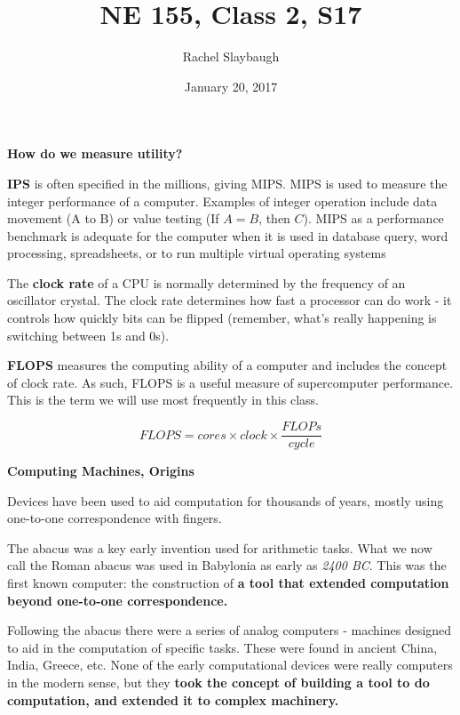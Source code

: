 \documentclass[12pt]{article}
\title{NE 155, Class 2, S17}
\author{Rachel Slaybaugh}
\date{January 20, 2017}
\begin{document}
\maketitle

\noindent \textbf{How do we measure utility?}

\textbf{IPS} is often specified in the millions, giving MIPS. MIPS is used to measure the integer performance of a computer. Examples of integer operation include data movement (A to B) or value testing (If $A = B$, then $C$). MIPS as a performance benchmark is adequate for the computer when it is used in database query, word processing, spreadsheets, or to run multiple virtual operating systems %

The \textbf{clock rate} of a CPU is normally determined by the frequency of an oscillator crystal. The clock rate determines how fast a processor can do work - it controls how quickly bits can be flipped (remember, what's really happening is switching between 1s and 0s).

\textbf{FLOPS} measures the computing ability of a computer and includes the concept of clock rate. As such, FLOPS is a useful measure of supercomputer performance. This is the term we will use most frequently in this class. 

\begin{equation}
FLOPS = cores \times clock \times \frac{FLOPs}{cycle} \nonumber
\end{equation}

\vspace*{2em}
\noindent \textbf{Computing Machines, Origins}

Devices have been used to aid computation for thousands of years, mostly using one-to-one correspondence with fingers. 

The abacus was a key early invention used for arithmetic tasks. What we now call the Roman abacus was used in Babylonia as early as \textit{2400 BC}. This was the first known computer: the construction of \textbf{a tool that extended computation beyond one-to-one correspondence.} 

Following the abacus there were a series of analog computers - machines designed to aid in the computation of specific tasks. These were found in ancient China, India, Greece, etc. None of the early computational devices were really computers in the modern sense, but they \textbf{took the concept of building a tool to do computation, and extended it to complex machinery.}
\end{document}
